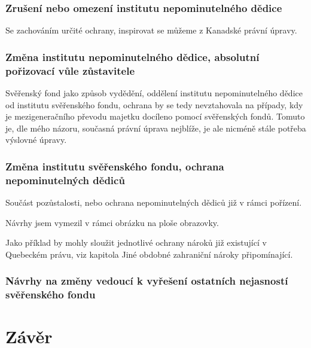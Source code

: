 \documentclass{article}
\begin{document}

\subsubsection{Zrušení nebo omezení institutu nepominutelného dědice}
Se zachováním určité ochrany, inspirovat se můžeme z Kanadské právní úpravy.
\subsubsection{Změna institutu nepominutelného dědice, absolutní pořizovací vůle zůstavitele}
Svěřenský fond jako způsob vydědění, oddělení institutu nepominutelného dědice od institutu svěřenského fondu, ochrana by se tedy nevztahovala na případy, kdy je mezigeneračního převodu majetku docíleno pomocí svěřenských fondů. Tomuto je, dle mého názoru, současná právní úprava nejblíže, je ale nicméně stále potřeba výslovné úpravy.
\subsubsection{Změna institutu svěřenského fondu, ochrana nepominutelných dědiců}
Součást pozůstalosti, nebo ochrana nepominutelných dědiců již v rámci pořízení.

Návrhy jsem vymezil v rámci obrázku na ploše obrazovky.


Jako příklad by mohly sloužit jednotlivé ochrany nároků již existující v Quebeckém právu, viz kapitola Jiné obdobné zahraniční nároky připomínající.

\subsubsection{Návrhy na změny vedoucí k vyřešení ostatních nejasností svěřenského fondu}

\newpage

\section{Závěr}

\end{document}
